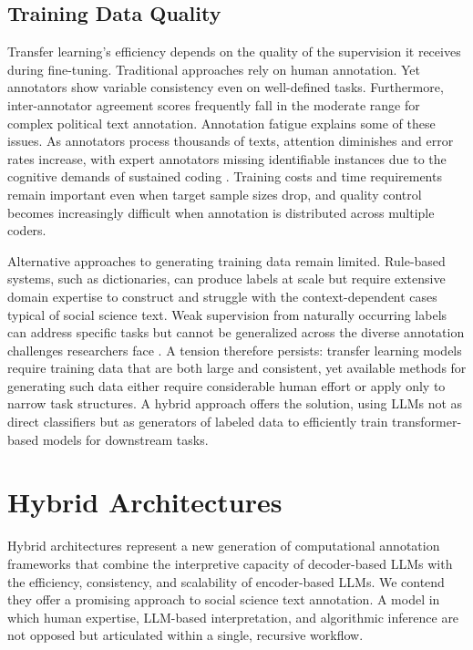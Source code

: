 \documentclass[12pt]{article}
\begin{document}
\subsection{Training Data Quality}

Transfer learning's efficiency depends on the quality of the supervision it receives during fine-tuning. Traditional approaches rely on human annotation. Yet annotators show variable consistency even on well-defined tasks. Furthermore, inter-annotator agreement scores frequently fall in the moderate range for complex political text annotation. Annotation fatigue explains some of these issues. As annotators process thousands of texts, attention diminishes and error rates increase, with expert annotators missing identifiable instances  due to the cognitive demands of sustained coding \parencite{do_etal24}. Training costs and time requirements remain important even when target sample sizes drop, and quality control becomes increasingly difficult when annotation is distributed across multiple coders.

Alternative approaches to generating training data remain limited. Rule-based systems, such as dictionaries, can produce labels at scale but require extensive domain expertise to construct and struggle with the context-dependent cases typical of social science text. Weak supervision from naturally occurring labels can address specific tasks but cannot be generalized across the diverse annotation challenges researchers face \parencite{matsuo_fukumoto25}. A tension therefore persists: transfer learning models require training data that are both large and consistent, yet available methods for generating such data either require considerable human effort or apply only to narrow task structures. A hybrid approach offers the solution, using LLMs not as direct classifiers but as generators of labeled data to efficiently train transformer-based models for  downstream tasks.

\section{Hybrid Architectures}

Hybrid architectures represent a new generation of computational annotation frameworks that combine the interpretive capacity of decoder-based LLMs with the efficiency, consistency, and scalability of encoder-based LLMs. We contend they offer a promising approach to social science text annotation. A model in which human expertise, LLM-based interpretation, and algorithmic inference are not opposed but articulated within a single, recursive workflow. 
\end{document}
